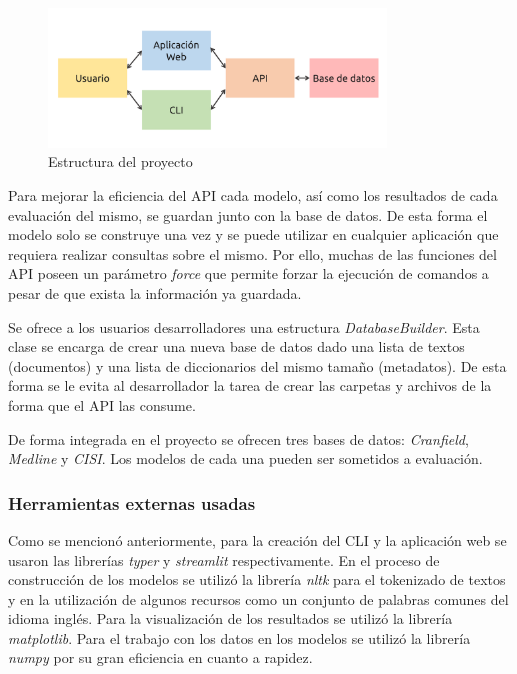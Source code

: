 \begin{figure}[htb]%
	\begin{center}
		\includegraphics[width=0.8\textwidth]{./sri_03.png}
	\end{center}
	\caption{Estructura del proyecto}
	\label{fig:project-structure}
\end{figure}

Para mejorar la eficiencia del API cada modelo, así como los resultados de cada
evaluación del mismo, se guardan junto con la base de datos. De esta forma el 
modelo solo se construye una vez y se puede utilizar en cualquier aplicación
que requiera realizar consultas sobre el mismo. Por ello, muchas de las funciones
del API poseen un parámetro \emph{force} que permite forzar la ejecución de
comandos a pesar de que exista la información ya guardada.

Se ofrece a los usuarios desarrolladores una estructura \emph{DatabaseBuilder}.
Esta clase se encarga de crear una nueva base de datos dado una lista de textos
(documentos) y una lista de diccionarios del mismo tamaño (metadatos). De
esta forma se le evita al desarrollador la tarea de crear las carpetas y archivos
de la forma que el API las consume.

De forma integrada en el proyecto se ofrecen tres bases de datos: \emph{Cranfield},
\emph{Medline} y \emph{CISI}. Los modelos de cada una pueden ser sometidos a 
evaluación.

\subsubsection{Herramientas externas usadas}\label{sec:external-tools}

Como se mencionó anteriormente, para la creación del CLI y la aplicación web se
usaron las librerías \emph{typer} y \emph{streamlit} respectivamente. En el
proceso de construcción de los modelos se utilizó la librería \emph{nltk} para
el tokenizado de textos y en la utilización de algunos recursos como un
conjunto de palabras comunes del idioma inglés. Para la visualización de los
resultados se utilizó la librería \emph{matplotlib}. Para el trabajo con los datos
en los modelos se utilizó la librería \emph{numpy} por su gran eficiencia en cuanto
a rapidez.
